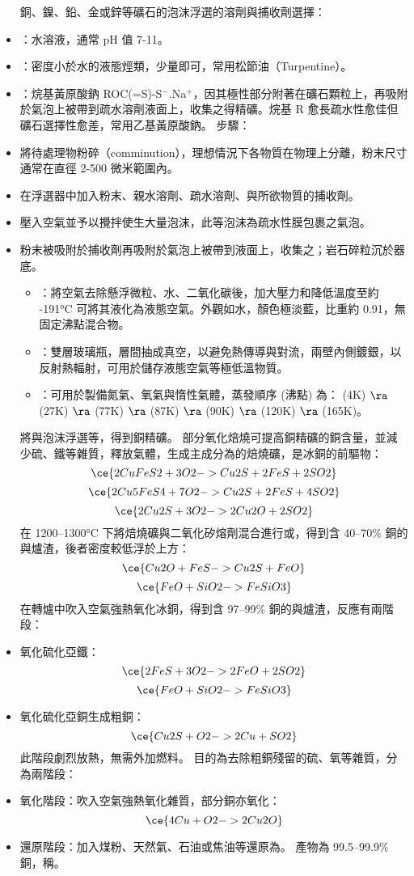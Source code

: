 \documentclass[a4paper,12pt]{report}
\begin{document}
\begin{itemize}
銅、鎳、鉛、金或鋅等礦石的泡沫浮選的溶劑與捕收劑選擇：
\bit
\item {}：水溶液，通常 pH 值 7-11。
\item {}：密度小於水的液態烴類，少量即可，常用松節油（Turpentine）。
\item {}：烷基黃原酸鈉 ROC(=S)-S$^-$.Na$^+$，因其極性部分附著在礦石顆粒上，再吸附於氣泡上被帶到疏水溶劑液面上，收集之得精礦。烷基 R 愈長疏水性愈佳但礦石選擇性愈差，常用乙基黃原酸鈉。
\eit
步驟：
\ben
\item 將待處理物粉碎（comminution），理想情況下各物質在物理上分離，粉末尺寸通常在直徑 2-500 微米範圍內。
\item 在浮選器中加入粉末、親水溶劑、疏水溶劑、與所欲物質的捕收劑。
\item 壓入空氣並予以攪拌使生大量泡沫，此等泡沫為疏水性膜包裹之氣泡。
\item 粉末被吸附於捕收劑再吸附於氣泡上被帶到液面上，收集之；岩石碎粒沉於器底。
\een
{}
\begin{itemize}
\item {}：將空氣去除懸浮微粒、水、二氧化碳後，加大壓力和降低溫度至約 -191°C 可將其液化為液態空氣。外觀如水，顏色極淡藍，比重約 0.91，無固定沸點混合物。
\item {}：雙層玻璃瓶，層間抽成真空，以避免熱傳導與對流，兩壁內側鍍銀，以反射熱輻射，可用於儲存液態空氣等極低溫物質。
\item {}：可用於製備氮氣、氧氣與惰性氣體，蒸發順序 (沸點) 為： (4K) $\ra$ (27K) $\ra$ (77K) $\ra$ (87K) $\ra$ (90K) $\ra$ (120K) $\ra$ (165K)。
\end{itemize}
將與泡沫浮選等，得到銅精礦。
部分氧化焙燒可提高銅精礦的銅含量，並減少硫、鐵等雜質，釋放氣體，生成主成分為的焙燒礦，是冰銅的前驅物：
\[\ce{2CuFeS2 + 3O2 -> Cu2S + 2FeS + 2SO2}\]
\[\ce{2Cu5FeS4 + 7O2 -> Cu2S + 2FeS + 4SO2}\]
\[\ce{2Cu2S + 3O2 -> 2Cu2O + 2SO2}\]
在 1200–1300°C 下將焙燒礦與二氧化矽熔劑混合進行或，得到含 40–70\% 銅的與爐渣，後者密度較低浮於上方：
\[\ce{Cu2O + FeS -> Cu2S + FeO}\]
\[\ce{FeO + SiO2 -> FeSiO3}\]
在轉爐中吹入空氣強熱氧化冰銅，得到含 97–99\% 銅的與爐渣，反應有兩階段：
\ben
\item 氧化硫化亞鐵：
\[\ce{2FeS + 3O2 -> 2FeO + 2SO2}\]
\[\ce{FeO + SiO2 -> FeSiO3}\]
\item 氧化硫化亞銅生成粗銅：  
\[\ce{Cu2S + O2 -> 2Cu + SO2}\]
此階段劇烈放熱，無需外加燃料。
\een
{}
目的為去除粗銅殘留的硫、氧等雜質，分為兩階段：
\ben
\item 氧化階段：吹入空氣強熱氧化雜質，部分銅亦氧化：
\[\ce{4Cu + O2 -> 2Cu2O}\]
\item 還原階段：加入煤粉、天然氣、石油或焦油等還原為。
\een
產物為 99.5–99.9\% 銅，稱。

\end{itemize}
\end{document}
